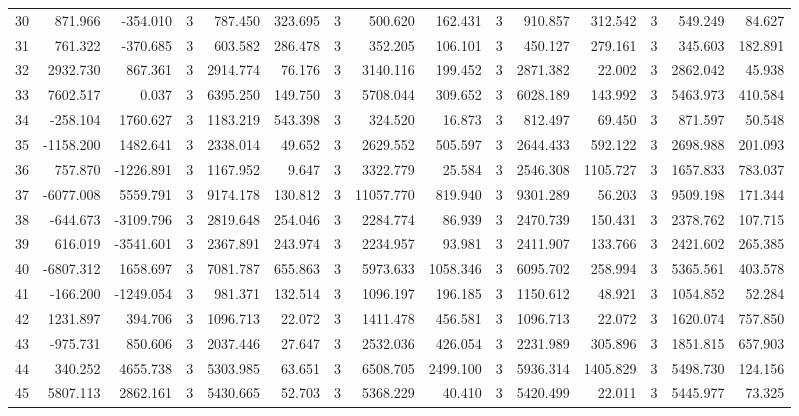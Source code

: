 \begin{table}[ht]
\begin{tabular}{lrrrrrrrrrrrrrr}
30 & 871.966 & -354.010 & 3 & 787.450 & 323.695 & 3 & 500.620 & 162.431 & 3 & 910.857 & 312.542 & 3 & 549.249 & 84.627 \\
31 & 761.322 & -370.685 & 3 & 603.582 & 286.478 & 3 & 352.205 & 106.101 & 3 & 450.127 & 279.161 & 3 & 345.603 & 182.891 \\
32 & 2932.730 & 867.361 & 3 & 2914.774 & 76.176 & 3 & 3140.116 & 199.452 & 3 & 2871.382 & 22.002 & 3 & 2862.042 & 45.938 \\
33 & 7602.517 & 0.037 & 3 & 6395.250 & 149.750 & 3 & 5708.044 & 309.652 & 3 & 6028.189 & 143.992 & 3 & 5463.973 & 410.584 \\
34 & -258.104 & 1760.627 & 3 & 1183.219 & 543.398 & 3 & 324.520 & 16.873 & 3 & 812.497 & 69.450 & 3 & 871.597 & 50.548 \\
35 & -1158.200 & 1482.641 & 3 & 2338.014 & 49.652 & 3 & 2629.552 & 505.597 & 3 & 2644.433 & 592.122 & 3 & 2698.988 & 201.093 \\
36 & 757.870 & -1226.891 & 3 & 1167.952 & 9.647 & 3 & 3322.779 & 25.584 & 3 & 2546.308 & 1105.727 & 3 & 1657.833 & 783.037 \\
37 & -6077.008 & 5559.791 & 3 & 9174.178 & 130.812 & 3 & 11057.770 & 819.940 & 3 & 9301.289 & 56.203 & 3 & 9509.198 & 171.344 \\
38 & -644.673 & -3109.796 & 3 & 2819.648 & 254.046 & 3 & 2284.774 & 86.939 & 3 & 2470.739 & 150.431 & 3 & 2378.762 & 107.715 \\
39 & 616.019 & -3541.601 & 3 & 2367.891 & 243.974 & 3 & 2234.957 & 93.981 & 3 & 2411.907 & 133.766 & 3 & 2421.602 & 265.385 \\
40 & -6807.312 & 1658.697 & 3 & 7081.787 & 655.863 & 3 & 5973.633 & 1058.346 & 3 & 6095.702 & 258.994 & 3 & 5365.561 & 403.578 \\
41 & -166.200 & -1249.054 & 3 & 981.371 & 132.514 & 3 & 1096.197 & 196.185 & 3 & 1150.612 & 48.921 & 3 & 1054.852 & 52.284 \\
42 & 1231.897 & 394.706 & 3 & 1096.713 & 22.072 & 3 & 1411.478 & 456.581 & 3 & 1096.713 & 22.072 & 3 & 1620.074 & 757.850 \\
43 & -975.731 & 850.606 & 3 & 2037.446 & 27.647 & 3 & 2532.036 & 426.054 & 3 & 2231.989 & 305.896 & 3 & 1851.815 & 657.903 \\
44 & 340.252 & 4655.738 & 3 & 5303.985 & 63.651 & 3 & 6508.705 & 2499.100 & 3 & 5936.314 & 1405.829 & 3 & 5498.730 & 124.156 \\
45 & 5807.113 & 2862.161 & 3 & 5430.665 & 52.703 & 3 & 5368.229 & 40.410 & 3 & 5420.499 & 22.011 & 3 & 5445.977 & 73.325 \\

\end{tabular}
\end{table}
